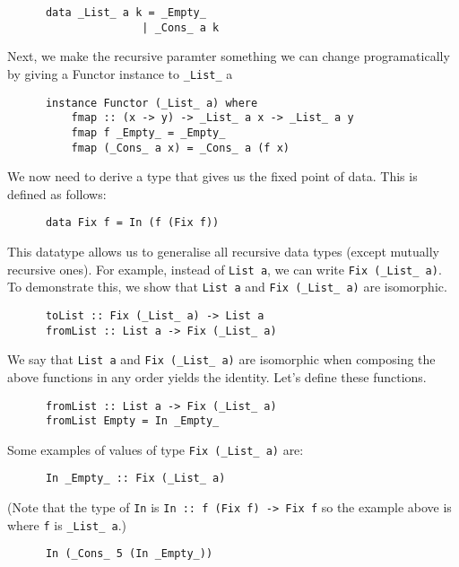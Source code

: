 \documentclass[a4paper,12pt]{article}
\theoremstyle{remark}
\begin{document}
  \begin{lstlisting}
      data _List_ a k = _Empty_
                     | _Cons_ a k  \end{lstlisting}

  Next, we make the recursive paramter something we can change programatically by
  giving a Functor instance to \lstinline{_List_} a

  \begin{lstlisting}
      instance Functor (_List_ a) where
          fmap :: (x -> y) -> _List_ a x -> _List_ a y
          fmap f _Empty_ = _Empty_
          fmap (_Cons_ a x) = _Cons_ a (f x)  \end{lstlisting}

  We now need to derive a type that gives us the fixed point of data. This is defined
  as follows:

  \begin{lstlisting}
      data Fix f = In (f (Fix f))  \end{lstlisting}

  This datatype allows us to generalise all recursive data types (except mutually
  recursive ones). For example, instead of \lstinline{List a}, we can write \lstinline{Fix (_List_ a)}. To
  demonstrate this, we show that \lstinline{List a} and \lstinline{Fix (_List_ a)} are isomorphic.

  \begin{lstlisting}
      toList :: Fix (_List_ a) -> List a
      fromList :: List a -> Fix (_List_ a)  \end{lstlisting}

  We say that \lstinline{List a} and \lstinline{Fix (_List_ a)} are isomorphic when composing the above functions
  in any order yields the identity. Let's define these functions.

  \begin{lstlisting}
      fromList :: List a -> Fix (_List_ a)
      fromList Empty = In _Empty_  \end{lstlisting}

  Some examples of values of type \lstinline{Fix (_List_ a)} are:

  \begin{lstlisting}
      In _Empty_ :: Fix (_List_ a)  \end{lstlisting}

  (Note that the type of \lstinline{In} is \lstinline{In :: f (Fix f) -> Fix f}
  so the example above is where \lstinline{f} is \lstinline{_List_ a}.)

  \begin{lstlisting}
      In (_Cons_ 5 (In _Empty_))  \end{lstlisting}
\end{document}
